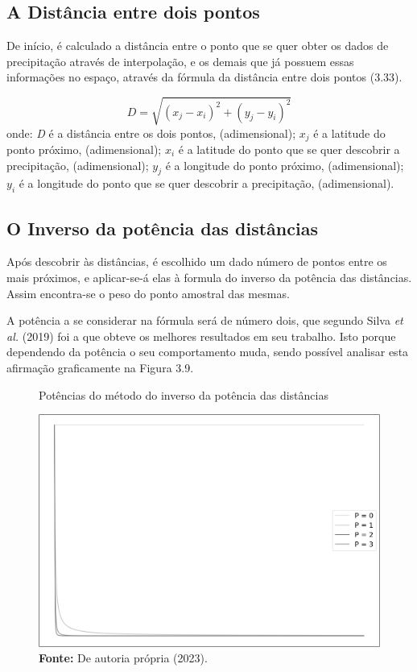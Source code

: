 \subsection{A Distância entre dois pontos}\bigskip

De início, é calculado a distância entre o ponto que se quer obter os dados de precipitação através de interpolação, e os demais que já possuem essas informações no espaço, através da fórmula da distância entre dois pontos (3.33).\bigskip

\begin{equation}
D = \sqrt{{\left(x_j - x_i\right)}^2 + {\left(y_j - y_i\right)}^2}
\end{equation}
\newline
onde:
\newline
\textit{D} é a distância entre os dois pontos, (adimensional);
\newline
$x_j$ é a latitude do ponto próximo, (adimensional);
\newline
$x_i$ é a latitude do ponto que se quer descobrir a precipitação, (adimensional);
\newline
$y_j$ é a longitude do ponto próximo, (adimensional);
\newline
$y_i$ é a longitude do ponto que se quer descobrir a precipitação, (adimensional).\bigskip

\subsection{O Inverso da potência das distâncias}\bigskip

Após descobrir às distâncias, é escolhido um dado número de pontos entre os mais próximos, e aplicar-se-á elas à formula do inverso da potência das distâncias. Assim encontra-se o peso do ponto amostral das mesmas. 

A potência a se considerar na fórmula será de número dois, que segundo Silva \textit{et al.} (2019) foi a que obteve os melhores resultados em seu trabalho. Isto porque dependendo da potência o seu comportamento muda, sendo possível analisar esta afirmação graficamente na Figura 3.9.

\newpage

\begin{figure}[!ht]
	\centering
	\caption{Potências do método do inverso da potência das distâncias}
	\includegraphics[width=.7325\linewidth]{figuras/potencias_da_idw.png}
	\caption*{\textbf{Fonte:} De autoria própria (2023).}
	\label{fig:potencias_da_idw.png}
\end{figure}


